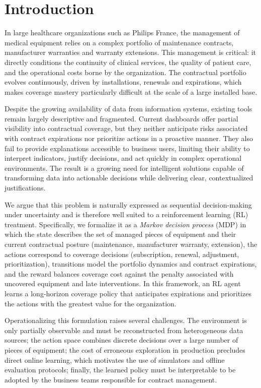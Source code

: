 \section{Introduction}
\label{sec:introduction}

In large healthcare organizations such as Philips France, the management of medical equipment relies on a complex portfolio of maintenance contracts, manufacturer warranties and warranty extensions. This management is critical: it directly conditions the continuity of clinical services, the quality of patient care, and the operational costs borne by the organization. The contractual portfolio evolves continuously, driven by installations, renewals and expirations, which makes coverage mastery particularly difficult at the scale of a large installed base.

Despite the growing availability of data from information systems, existing tools remain largely descriptive and fragmented. Current dashboards offer partial visibility into contractual coverage, but they neither anticipate risks associated with contract expirations nor prioritize actions in a proactive manner. They also fail to provide explanations accessible to business users, limiting their ability to interpret indicators, justify decisions, and act quickly in complex operational environments. The result is a growing need for intelligent solutions capable of transforming data into actionable decisions while delivering clear, contextualized justifications.

We argue that this problem is naturally expressed as sequential decision-making under uncertainty and is therefore well suited to a reinforcement learning (RL) treatment. Specifically, we formalize it as a \emph{Markov decision process} (MDP) in which the state describes the set of managed pieces of equipment and their current contractual posture (maintenance, manufacturer warranty, extension), the actions correspond to coverage decisions (subscription, renewal, adjustment, prioritization), transitions model the portfolio dynamics and contract expirations, and the reward balances coverage cost against the penalty associated with uncovered equipment and late interventions. In this framework, an RL agent learns a long-horizon coverage policy that anticipates expirations and prioritizes the actions with the greatest value for the organization.

Operationalizing this formulation raises several challenges. The environment is only partially observable and must be reconstructed from heterogeneous data sources; the action space combines discrete decisions over a large number of pieces of equipment; the cost of erroneous exploration in production precludes direct online learning, which motivates the use of simulators and offline evaluation protocols; finally, the learned policy must be interpretable to be adopted by the business teams responsible for contract management.

